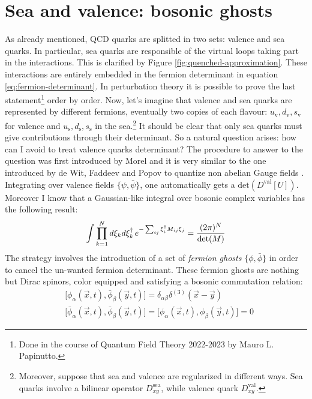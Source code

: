 \documentclass[english, LaM, oneside, noexaminfo]{sapthesis}
\begin{document}
\section{Sea and valence: bosonic ghosts}\label{sec:ghosts}
\noindent
As already mentioned, QCD quarks are splitted in two sets: valence and sea quarks.
In particular, sea quarks are responsible of the virtual loops taking part in the interactions.
This is clarified by Figure \ref{fig:quenched-approximation}.
These interactions are entirely embedded in the fermion determinant in equation \ref{eq:fermion-determinant}.
In perturbation theory it is possible to prove the last statement\footnote{Done in the course of Quantum Field Theory 2022-2023 by Mauro L. Papinutto.} order by order.
Now, let's imagine that valence and sea quarks are represented by different fermions, eventually two copies of each flavour: $u_\text{v}, d_\text{v}, s_\text{v}$ for valence and $u_\text{s}, d_\text{s}, s_\text{s}$ in the sea.\footnote{Moreover, suppose that sea and valence are regularized in different ways. Sea quarks involve a bilinear operator $D^\text{sea}_{xy}$, while valence quark $D^\text{val}_{xy}$.}
It should be clear that only sea quarks must give contributions through their determinant.
So a natural question arises: how can I avoid to treat valence quarks determinant?
\newline
The procedure to answer to the question was first introduced by Morel \cite{Morel} and it is very similar to the one introduced by de Wit, Faddeev and Popov to quantize non abelian Gauge fields \cite{WeinbergII}.
Integrating over valence fields $\{\psi,\bar\psi\}$, one automatically gets a $\text{det}(D^\text{val}[U])$. 
Moreover I know that a Gaussian-like integral over bosonic complex variables has the following result:
\begin{equation*}
    \int \prod_{k = 1}^{N} d \xi_k  d\xi_k^\dag \hspace*{.5mm} e^{-\sum_{ij} \xi_i^\dag M_{ij} \xi_j} = \frac{(2\pi)^N}{\text{det}(M)}
\end{equation*}
The strategy involves the introduction of a set of {\it fermion ghosts} $\{\phi, \bar\phi \}$ in order to cancel the un-wanted fermion determinant.
These fermion ghosts are nothing but Dirac spinors, color equipped and satisfying a bosonic commutation relation:
\begin{equation*}
    \begin{aligned}
        & \big[\phi_\alpha (\vec x,t), \bar\phi_\beta (\vec y,t)\big] = \delta_{\alpha\beta}\delta^{(3)}(\vec x-\vec y) \\
        & \big[\bar\phi_\alpha (\vec x,t), \bar\phi_\beta (\vec y,t)\big] = \big[\phi_\alpha (\vec x,t), \phi_\beta (\vec y,t)\big] = 0
    \end{aligned}    
\end{equation*}
\end{document}
